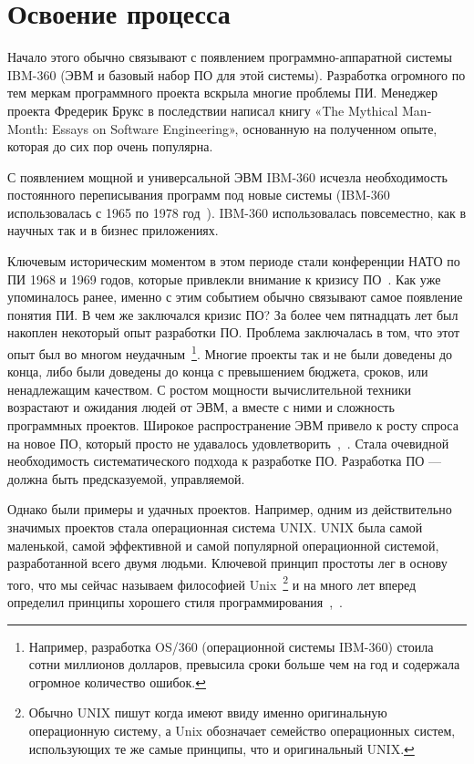 \section{Освоение процесса}

Начало этого обычно связывают с появлением программно-аппаратной системы IBM-360 (ЭВМ и базовый набор ПО для этой системы). Разработка огромного по тем меркам программного проекта вскрыла многие проблемы ПИ. Менеджер проекта Фредерик Брукс в последствии написал книгу «The Mythical Man-Month: Essays on Software Engineering», основанную на полученном опыте, которая до сих пор очень популярна.

С появлением мощной и универсальной ЭВМ IBM-360 исчезла необходимость постоянного переписывания программ под новые системы (IBM-360 использовалась с 1965 по 1978 год~\cite{IBM360}). IBM-360 использовалась повсеместно, как в научных так и в бизнес приложениях.

Ключевым историческим моментом в этом периоде стали конференции НАТО по ПИ 1968 и 1969 годов, которые привлекли внимание к кризису ПО~\cite{CRISIS}. Как уже упоминалось ранее, именно с этим событием обычно связывают самое появление понятия ПИ. В чем же заключался кризис ПО?  За более чем пятнадцать лет был накоплен некоторый опыт разработки ПО. Проблема заключалась в том, что этот опыт был во многом неудачным~\footnote{Например, разработка OS/360 (операционной системы IBM-360) стоила сотни миллионов долларов, превысила сроки больше чем на год и содержала огромное количество ошибок.}. Многие проекты так и не были доведены до конца, либо были доведены до конца с превышением бюджета, сроков, или ненадлежащим качеством. С ростом мощности вычислительной техники возрастают и ожидания людей от ЭВМ, а вместе с ними и сложность программных проектов. Широкое распространение ЭВМ привело к росту спроса на новое ПО, который просто не удавалось удовлетворить~\cite{Dijkstra:1972:HP},~\cite{CRISIS}. Стала очевидной необходимость систематического подхода к разработке ПО. Разработка ПО — должна быть предсказуемой, управляемой.

Однако были примеры и удачных проектов. Например, одним из действительно значимых проектов стала операционная система UNIX. UNIX была самой маленькой, самой эффективной и самой популярной операционной системой, разработанной всего двумя людьми. Ключевой принцип простоты лег в основу того, что мы сейчас называем философией Unix~\footnote{Обычно UNIX пишут когда имеют ввиду именно оригинальную операционную систему, а Unix обозначает семейство операционных систем, использующих те же самые принципы, что и оригинальный UNIX.} и на много лет вперед определил принципы хорошего стиля программирования~\cite{Ritchie:1974:UTS},~\cite{McIlroy:1978:UTS}.

